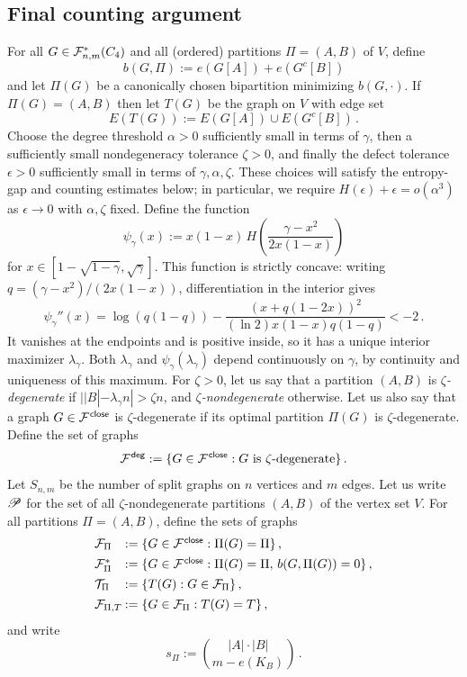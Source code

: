 \subsection{Final counting argument}
For all $G\in{\mathcal F}^\ast_{n,m}(C_4)$ and all (ordered) partitions $\Pi=(A,B)$ of $V$, define
$$b(G,\Pi):=e(G[A])+e(G^c[B])$$
and let $\Pi(G)$ be a canonically chosen bipartition minimizing $b(G,\cdot)$. If $\Pi(G)=(A,B)$ then let $T(G)$ be the graph on $V$ with edge set
$$E(T(G)):=E(G[A])\cup E(G^c[B])\,.$$
Choose the degree threshold $\alpha>0$ sufficiently small in terms of $\gamma$, then a sufficiently small nondegeneracy tolerance $\zeta>0$, and finally the defect tolerance $\epsilon>0$ sufficiently small in terms of $\gamma,\alpha,\zeta$. These choices will satisfy the entropy-gap and counting estimates below; in particular, we require $H(\epsilon)+\epsilon=o(\alpha^3)$ as $\epsilon\to0$ with $\alpha,\zeta$ fixed. Define the function
$$\psi_\gamma(x):=x(1-x)\,H\!\left(\frac{\gamma-x^2}{2x(1-x)}\right)$$
for $x\in[1-\sqrt{1-\gamma},\sqrt{\gamma}]$. This function is strictly concave: writing $q=(\gamma-x^2)/(2x(1-x))$, differentiation in the interior gives
$$\psi_\gamma''(x)=\log(q(1-q))-\frac{(x+q(1-2x))^2}{(\ln2)x(1-x)q(1-q)}<-2\,.$$
It vanishes at the endpoints and is positive inside, so it has a unique interior maximizer $\lambda_\gamma$. Both $\lambda_\gamma$ and $\psi_\gamma(\lambda_\gamma)$ depend continuously on $\gamma$, by continuity and uniqueness of this maximum. For $\zeta>0$, let us say that a partition $(A,B)$ is \emph{$\zeta$-degenerate} if $||B|-\lambda_\gamma n|>\zeta n$, and \emph{$\zeta$-nondegenerate} otherwise. Let us also say that a graph $G\in{\mathcal F}^{\hspace{0.2mm}\mathsf{close}}$ is $\zeta$-degenerate if its optimal partition $\Pi(G)$ is $\zeta$-degenerate. Define the set of graphs
$${\mathcal F}^{\hspace{0.2mm}\mathsf{deg}}:=\{G\in{\mathcal F}^{\hspace{0.2mm}\mathsf{close}}:G\text{ is $\zeta$-degenerate}\}\,.$$
Let $S_{n,m}$ be the number of split graphs on $n$ vertices and $m$ edges. Let us write ${\mathscr P}$ for the set of all $\zeta$-nondegenerate partitions $(A,B)$ of the vertex set $V$. For all partitions $\Pi=(A,B)$, define the sets of graphs
\[\arraycolsep=0.4mm
\begin{array}{ll}
\cF_\Pi &:= \{G\in\cF^\close:\Pi(G)=\Pi\} \,, \\[4pt]
\cF^\ast_\Pi &:= \{G\in\cF^\close:\Pi(G)=\Pi,\,b(G,\Pi(G))=0\} \,, \\[4pt]
\cT_\Pi &:= \{T(G):G\in\cF_\Pi\} \,, \\[4pt]
\cF_{\Pi,T} &:= \{G\in\cF_\Pi:T(G)=T\} \,,
\end{array}\]
and write
$$s_\Pi:=\binom{|A|\cdot|B|}{m-e(K_B)}\,.$$


